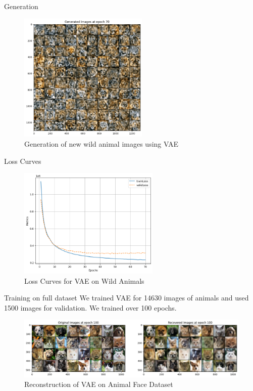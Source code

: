 \begin{frame}{Generation}
    \begin{figure}
        \centering
        \includegraphics[width=0.55\textwidth]{../ReportNeurips/wildanimal1.png}
        \caption{Generation of new wild animal images using VAE}
    \end{figure}
\end{frame}

\begin{frame}{Loss Curves}
    \begin{figure}
        \centering
        \includegraphics[width=0.6\textwidth]{../ReportNeurips/losscurve2.png}
        \caption{Loss Curves for VAE on Wild Animals}
    \end{figure}
\end{frame}

\begin{frame}{Training on full dataset}
    We trained VAE for 14630 images of animals and used 1500 images for validation. We trained over 100 epochs.
    \begin{figure}
        \centering
        \includegraphics[width=1\textwidth]{../ReportNeurips/reconstructfull.png}
        \caption{Reconstruction of VAE on Animal Face Dataset}
    \end{figure}
\end{frame}

